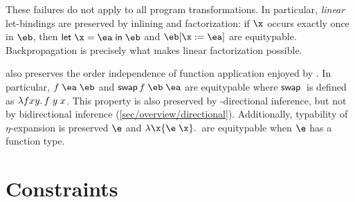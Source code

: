 \documentclass[acmsmall,screen,nonacm%
\Anonymous{,anonymous}{}%
\Final{}{,review}%
]{acmart}
\begin{document}
These failures do not apply to all program transformations. In particular,
\emph{linear} let-bindings are preserved by inlining and factorization: if $\x$
occurs exactly once in $\eb$, then $\elet \x \ea \eb$ and $\eb\where{\x\is\ea}$
are equitypable. Backpropagation is precisely what makes linear factorization
possible. 

\OML also preserves the order independence of function application enjoyed by
\ML. In particular, $\eappp f \ea \eb$ and $\eappp {\eswap f} \eb \ea$ are
equitypable where ${\mathopen{}\mathrel{\mathsf{swap}}\,}$ is defined as $\lambda f x y. \, f \; y \; x$. This
property is also preserved by \geninst-directional inference, but not by
bidirectional inference (\cref{sec/overview/directional}). Additionally,
typability of $\eta$-expansion is preserved \ie $\e$ and $\efun \x {\eapp \e
\x}$ are equitypable when $\e$ has a function type. 


\section{Constraints}
\label{sec:constraints}


\end{document}
